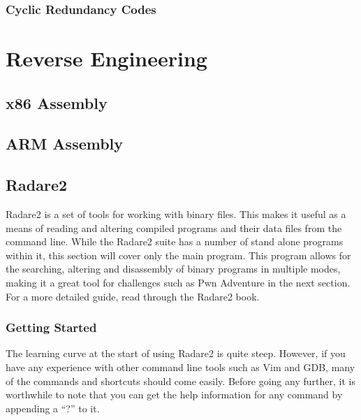 \documentclass[a4paper,11pt]{report}
\begin{document}
		\subsection{Cyclic Redundancy Codes}
\chapter{Reverse Engineering}
	\label{ch:ReverseEngineering}
	\section{x86 Assembly}
	\section{ARM Assembly}
	\section{Radare2}
		Radare2 is a set of tools for working with binary files. 
		This makes it useful as a means of reading and altering compiled programs and their data files from the command line. 
		While the Radare2 suite has a number of stand alone programs within it, this section will cover only the main program. 
		This program allows for the searching, altering and disassembly of binary programs in multiple modes, making it a great tool for challenges such as Pwn Adventure in the next section.
		For a more detailed guide, read through the Radare2 book.\cite{Radare2}

		\subsection{Getting Started}
			The learning curve at the start of using Radare2 is quite steep. 
			However, if you have any experience with other command line tools such as Vim and GDB, many of the commands and shortcuts should come easily. 
			Before going any further, it is worthwhile to note that you can get the help information for any command by appending a ``?'' to it. 
\end{document}
